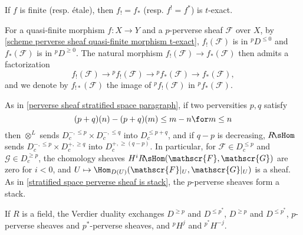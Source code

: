 \begin{corollary}\label{scheme perverse sheaf finite etale morphism t-exact}
If $f$ is finite (resp. \'etale), then $f_!=f_*$ (resp. $f^!=f^*$) is $t$-exact.
\end{corollary}

For a quasi-finite morphism $f:X\to Y$ and a $p$-perverse sheaf $\mathscr{F}$ over $X$, by \cref{scheme perverse sheaf quasi-finite morphism t-exact}, $f_!(\mathscr{F})$ is in ${^p\!D^{\leq 0}}$ and $f_*(\mathscr{F})$ is in ${^p\!D^{\geq 0}}$. The natural morphism $f_!(\mathscr{F})\to f_*(\mathscr{F})$ then admits a factorization
\begin{equation}\label{scheme perverse sheaf f_! to f_*}
f_!(\mathscr{F})\to {^p\!f_!}(\mathscr{F})\to {^p\!f_*}(\mathscr{F})\to f_*(\mathscr{F}),
\end{equation}
and we denote by $f_{!*}(\mathscr{F})$ the image of ${^p\!f_!}(\mathscr{F})$ in ${^p\!f_*}(\mathscr{F})$.\par

As in \ref{perverse sheaf stratified space paragraph}, if two perversities $p,q$ satisfy 
\[(p+q)(n)-(p+q)(m)\leq m-n\for m\leq n\]
then $\otimes^L$ sends $D_c^{-,\leq p}\times D_c^{-,\leq q}$ into $D^{\leq p+q}_c$, and if $q-p$ is decreasing, $R\!\sHom$ sends $D_c^{-,\leq p}\times D_c^{+,\geq q}$ into $D_c^{+,\geq(q-p)}$. In particular, for $\mathscr{F}\in D_c^{\leq p}$ and $\mathscr{G}\in D_c^{\geq p}$, the chomology sheaves $H^iR\!\sHom(\mathscr{F},\mathscr{G})$ are zero for $i<0$, and $U\mapsto\Hom_{D(U)}(\mathscr{F}|_U,\mathscr{G}|_U)$ is a sheaf. As in \cref{stratified space perverse sheaf is stack}, the $p$-perverse sheaves form a stack.\par
If $R$ is a field, the Verdier duality exchanges $D^{\geq p}$ and $D^{\leq p^*}$, $D^{\geq p}$ and $D^{\leq p^*}$, $p$-perverse sheaves and $p^*$-perverse sheaves, and ${^p\!H^j}$ and ${^{p^*}H^{-j}}$.

